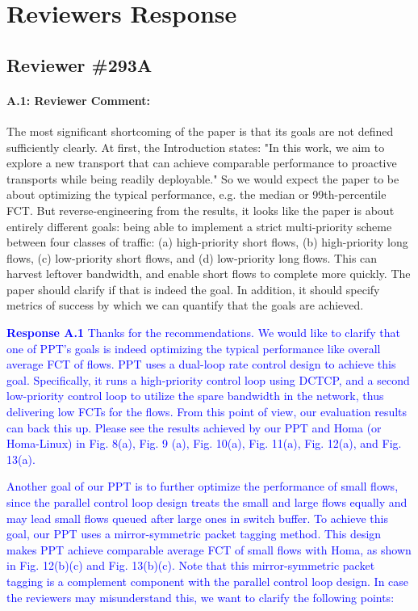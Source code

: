 \documentclass[12pt,one-column]{article}
\begin{document}
\section{Reviewers Response}
\subsection{Reviewer \#293A}
{\it \paragraph{A.1: Reviewer Comment:} The most significant shortcoming of the paper is that its goals are not defined sufficiently clearly. At first, the Introduction states: "In this work, we aim to explore a new transport that can achieve comparable performance to proactive transports while being readily deployable." So we would expect the paper to be about optimizing the typical performance, e.g. the median or 99th-percentile FCT. But reverse-engineering from the results, it looks like the paper is about entirely different goals: being able to implement a strict multi-priority scheme between four classes of traffic: (a) high-priority short flows, (b) high-priority long flows, (c) low-priority short flows, and (d) low-priority long flows. This can harvest leftover bandwidth, and enable short flows to complete more quickly. The paper should clarify if that is indeed the goal. In addition, it should specify metrics of success by which we can quantify that the goals are achieved.}

\noindent\textcolor{blue}{\textbf{Response A.1}
Thanks for the recommendations.
We would like to clarify that one of PPT's goals is indeed optimizing the typical performance like overall average FCT of flows. PPT uses a dual-loop rate control design to achieve this goal. Specifically, it runs a high-priority control loop using DCTCP, and a second low-priority control loop to utilize the spare bandwidth in the network, thus delivering low FCTs for the flows. 
From this point of view, our evaluation results can back this up. Please see the results achieved by our PPT and Homa (or Homa-Linux) in Fig. 8(a), Fig. 9 (a), Fig. 10(a), Fig. 11(a), Fig. 12(a), and Fig. 13(a). 	
}

\textcolor{blue}{Another goal of our PPT is to further optimize the performance of small flows, since the parallel control loop design treats the small and large flows equally and may lead small flows queued after large ones in switch buffer. To achieve this goal, our PPT uses a mirror-symmetric packet tagging method. This design makes PPT achieve comparable average FCT of small flows with Homa, as shown in Fig. 12(b)(c) and Fig. 13(b)(c). Note that this mirror-symmetric packet tagging is a complement component with the parallel control loop design. In case the reviewers may misunderstand this, we want to clarify the following points:}
\end{document}
